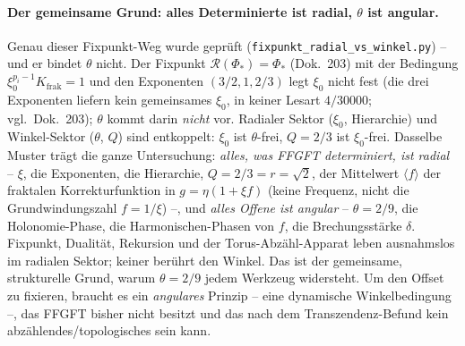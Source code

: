 \paragraph{Der gemeinsame Grund: alles Determinierte ist radial, $\theta$ ist angular.} Genau dieser
Fixpunkt-Weg wurde geprüft (\texttt{fixpunkt\_radial\_vs\_winkel.py}) -- und er bindet $\theta$ nicht.
Der Fixpunkt $\mathcal R(\Phi_*)=\Phi_*$ (Dok.~203) mit der Bedingung $\xi_0^{p_i-1}K_{\text{frak}}=1$
und den Exponenten $(3/2,1,2/3)$ legt $\xi_0$ nicht fest (die drei Exponenten liefern kein gemeinsames $\xi_0$, in keiner Lesart $4/30000$; vgl.\ Dok.~203);
$\theta$ kommt darin \emph{nicht} vor. Radialer Sektor ($\xi_0$,
Hierarchie) und Winkel-Sektor ($\theta$, $Q$) sind entkoppelt: $\xi_0$ ist $\theta$-frei, $Q=2/3$ ist
$\xi_0$-frei. Dasselbe Muster trägt die ganze Untersuchung: \emph{alles, was FFGFT determiniert, ist
radial} -- $\xi$, die Exponenten, die Hierarchie, $Q=2/3=r{=}\sqrt2$, der Mittelwert $\langle f\rangle$ der fraktalen Korrekturfunktion in $g = \eta(1+\xi f)$ (keine Frequenz, nicht die Grundwindungszahl $f = 1/\xi$)
--, und \emph{alles Offene ist angular} -- $\theta=2/9$, die Holonomie-Phase, die Harmonischen-Phasen von
$f$, die Brechungsstärke $\delta$. Fixpunkt, Dualität, Rekursion und der Torus-Abzähl-Apparat leben
ausnahmslos im radialen Sektor; keiner berührt den Winkel. Das ist der gemeinsame, strukturelle Grund,
warum $\theta=2/9$ jedem Werkzeug widersteht. Um den Offset zu fixieren, braucht es ein \emph{angulares}
Prinzip -- eine dynamische Winkelbedingung --, das FFGFT bisher nicht besitzt und das nach dem
Transzendenz-Befund kein abzählendes/topologisches sein kann.

